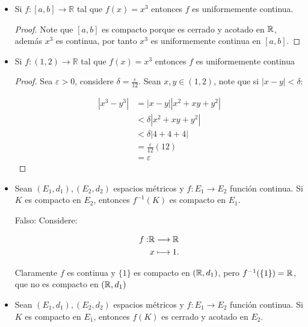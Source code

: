\begin{itemize}[label={✎},leftmargin=*]

\item  Si $f:[a, b] \rightarrow \mathbb{R}$ tal que $f(x)=x^3$ entonces $f$ es uniformemente continua.\\

\begin{proof}
Note que $[a,b]$ es compacto porque es cerrado y acotado en $\mathbb{R}$, además $x^3$ es continua, por tanto $x^3$ es uniformemente continua en $[a,b]$.
\end{proof}

\item Si $f:(1,2) \rightarrow \mathbb{R}$ tal que $f(x)=x^3$ entonces $f$ es uniformemente continua\\

 \begin{proof}
 Sea $\varepsilon>0$, considere $\delta=\frac{\varepsilon}{12}$. Sean $x,y \in (1,2)$, note que si $|x-y|<\delta$:

 \begin{align*}
    |x^3-y^3|&=|x-y||x^2+xy+y^2|\\
    &<\delta|x^2+xy+y^2|\\
    &<\delta|4+4+4|\\
    &=\frac{\varepsilon}{12}(12)\\
    &=\varepsilon
 \end{align*}
 \end{proof}    


\item  Sean $\left(E_1, d_1\right),\left(E_2, d_2\right)$ espacios métricos y $f: E_1 \rightarrow E_2$ función continua. Si $K$ es compacto en $E_2$, entonces $f^{-1}(K)$ es compacto en $E_1$.

Falso: Considere:

\begin{align*}
    f: &\mathbb{R} \longrightarrow \mathbb{R}\\
&\hspace*{0.05cm}x \longmapsto 1
.\end{align*}

Claramente $f$ es continua y $\{1\}$ es compacto en $(\mathbb{R},d_1)$, pero $f^{-1}(\{1\})=\mathbb{R}$, que no es compacto en $(\mathbb{R},d_1)$

\item Sean $\left(E_1, d_1\right),\left(E_2, d_2\right)$ espacios métricos y $f: E_1 \rightarrow E_2$ función continua. Si $K$ es compacto en $E_1$, entonces $f(K)$ es cerrado y acotado en $E_2$.\\


\end{itemize}
